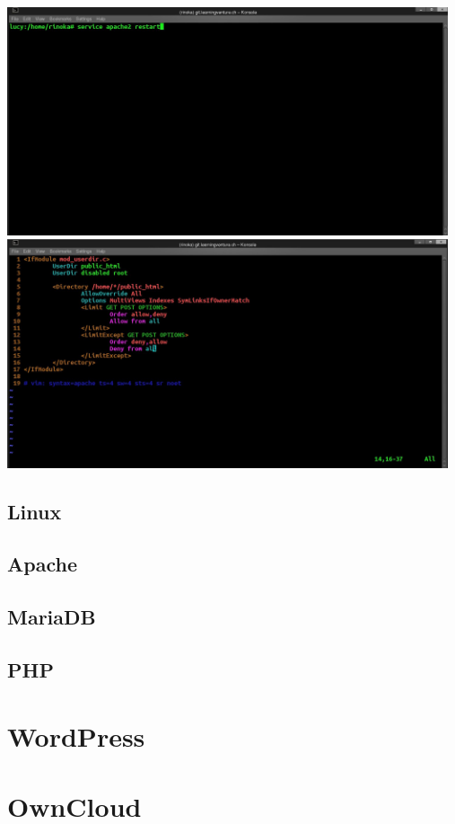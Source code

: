 \documentclass{article}
\begin{document}
	\includegraphics[width=13cm]{../Pics/apach2restart}
	\includegraphics[width=13cm]{../Pics/6_userdirconf}
	\subsection{Linux}
	\subsection{Apache}
	\subsection{MariaDB}
	\subsection{PHP}
	\section{WordPress}
	\section{OwnCloud}
\end{document}
